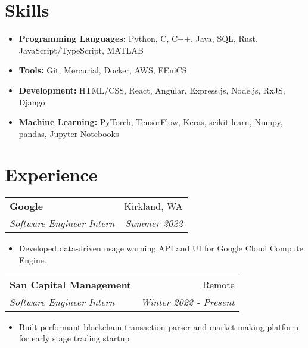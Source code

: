 \documentclass[letterpaper,11pt]{article}
\makeatletter
\newcommand{\resitem}[1]{\item[--] #1}
\newcommand{\ressubheading}[4]{
	\begin{tabular*}{7.5in}{l@{\extracolsep{\fill}}r}
			\textbf{#1} & #2 \\
			\textit{#3} & \textit{#4}
	\end{tabular*}
}
\makeatother
\begin{document}


\section{Skills}

\begin{itemize}
	\resitem{
		\textbf{Programming Languages:}
			Python,
			C,
			C++,
			Java,
			SQL,
			Rust,
			JavaScript/TypeScript,
			MATLAB
	}
	\resitem{
		\textbf{Tools:}
			Git,
			Mercurial,
			Docker,
			AWS,
			FEniCS
	}
	\resitem{
		\textbf{Development:}
			HTML/CSS,
			React,
			Angular,
			Express.js,
			Node.js,
			RxJS,
			Django
	}
	\resitem{
		\textbf{Machine Learning:}
			PyTorch,
			TensorFlow,
			Keras,
			scikit-learn,
			Numpy,
			pandas,
			Jupyter Notebooks
	}
\end{itemize}

\section{Experience}

\ressubheading{Google}
			  {Kirkland, WA}
			  {Software Engineer Intern}
			  {Summer 2022}
\begin{itemize}
	\resitem{
		Developed data-driven usage warning API and UI for Google Cloud Compute 
		Engine.
	}
\end{itemize}

\ressubheading{San Capital Management}{Remote}{Software Engineer Intern}
{Winter 2022 - Present}
\begin{itemize}
	\resitem{
		Built performant blockchain transaction parser and market making
		platform for early stage trading startup
	}
\end{itemize}
\end{document}
